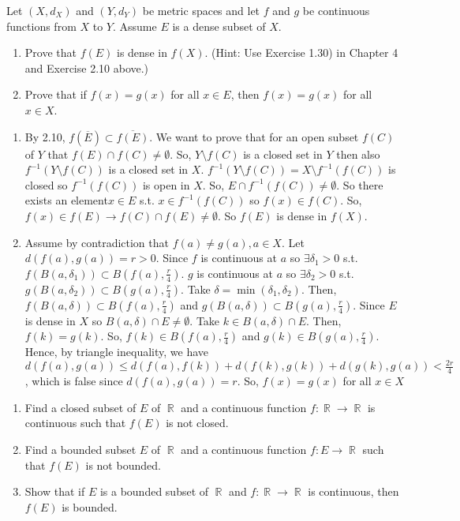 \documentclass[12pt,letterpaper,boxed]{hmcpset}
\DeclareMathOperator{\R}{\mathbb{R}}
\begin{document}
\begin{problem}[Exercise 2.11]
Let $(X, d_X)$ and $(Y, d_Y)$ be metric spaces and let $f$ and $g$ be continuous functions from $X$ to $Y$. Assume $E$ is a dense subset of $X$.
\vspace{-2mm}
\begin{enumerate}
    \itemsep0em
    \item Prove that $f(E)$ is dense in $f(X).$ (Hint: Use Exercise 1.30) in Chapter 4 and Exercise 2.10 above.)
    \item Prove that if $f(x) = g(x)$ for all $x \in E$, then $f(x) = g(x)$ for all $x\in X$.
\end{enumerate} 
\end{problem}

\begin{solution}
\begin{enumerate}
     \itemsep0em
    \item By 2.10, $f(\overline{E})\subset\overline{f(E)}$. We want to prove that for an open subset $f(C)$ of $Y$ that $f(E) \cap f(C)\neq \emptyset$. So, $Y\setminus f(C)$ is a closed set in $Y$ then also $f^{-1}(Y\setminus f(C))$ is a closed set in $X$. $f^{-1}(Y\setminus f(C))=X\setminus f^{-1}(f(C))$ is closed so $f^{-1}(f(C))$ is open in $X$. So, $E\cap f^{-1}(f(C))\neq \emptyset.$ So there exists an element$x\in E$ s.t. $x \in f^{-1}(f(C))$ so $f(x) \in f(C).$ So, $f(x) \in f(E) \rightarrow f(C)\cap f(E)\neq \emptyset$. So $f(E)$ is dense in $f(X).$
    \item Assume by contradiction that $f(a)\neq g(a), a\in X$. Let $d(f(a), g(a)) = r > 0$. Since $f$ is continuous at $a$ so $\exists \delta_1 > 0$ s.t. $f(B(a, \delta_1))\subset B(f(a),\frac{r}{4})$. $g$ is continuous at $a$ so $\exists \delta_2 > 0$ s.t. $g(B(a, \delta_2))\subset B(g(a),\frac{r}{4})$. Take $\delta = \min(\delta_1, \delta_2)$. Then, $f(B(a, \delta))\subset B(f(a),\frac{r}{4})$ and $g(B(a, \delta))\subset B(g(a),\frac{r}{4})$. Since $E$ is dense in $X$ so $B(a, \delta)\cap E \neq \emptyset$. Take $k\in B(a, \delta)\cap E$. Then, $f(k)=g(k).$ So, $f(k)\in B(f(a), \frac{r}{4})$ and $g(k)\in B(g(a), \frac{r}{4})$. Hence, by triangle inequality, we have $d(f(a), g(a)) \leq d(f(a), f(k)) + d(f(k), g(k)) + d(g(k), g(a)) < \frac{2r}{4}$, which is false since $d(f(a), g(a))=r.$ So, $f(x)=g(x)$ for all $x\in X$
\end{enumerate}
\end{solution}

\begin{problem}[Exercise 2.23]
\begin{enumerate}
    \itemsep0em
    \item Find a closed subset of $E$ of $\R$ and a continuous function $f: \R \rightarrow \R$ is continuous such that $f(E)$ is not closed.
    \item Find a bounded subset $E$ of $\R$ and a continuous function $f : E \rightarrow \R$ such that $f(E)$ is not bounded.
    \item Show that if $E$ is a bounded subset of $\R$ and $f: \R \rightarrow \R$ is continuous, then $f(E)$ is bounded.
\end{enumerate} 
\end{problem}
\end{document}
